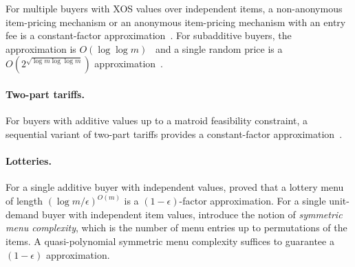 For multiple buyers with XOS values over independent items, a non-anonymous item-pricing mechanism or an anonymous item-pricing mechanism with an entry fee is a constant-factor approximation~\citep{Cai17:Simple}. For  subadditive buyers, the approximation is $O(\log\log m)$~\citep{Dutting20:Log} and a single random price is a $O(2^{\sqrt{\log m \log\log m}})$ approximation~\citep{Balcan08:Item}.

\paragraph{Two-part tariffs.} For buyers with additive values up to a matroid feasibility constraint, a sequential variant of two-part tariffs provides a constant-factor approximation~\citep{Chawla16:Mechanism}.


\paragraph{Lotteries.}
For a single additive buyer with independent values, \citet{Babaioff17:Menu} proved that a lottery menu of length $(\log m / \epsilon)^{O(m)}$ is a $(1-\epsilon)$-factor approximation. For a single unit-demand buyer with independent item values, \citet{Kothari19:Approximation} introduce the notion of \emph{symmetric menu complexity}, which is the number of menu entries up to permutations of the items. A quasi-polynomial symmetric menu complexity suffices to guarantee a $(1-\epsilon)$ approximation.

